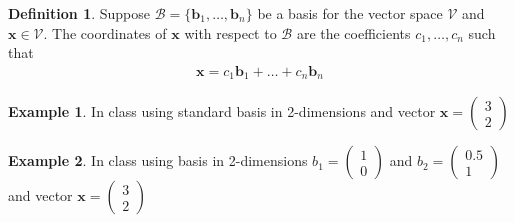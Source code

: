 \documentclass[
]{book}
\newenvironment{Shaded}{\begin{snugshade}}{\end{snugshade}}
\newcommand{\DataTypeTok}[1]{\textcolor[rgb]{0.13,0.29,0.53}{#1}}
\newcommand{\DecValTok}[1]{\textcolor[rgb]{0.00,0.00,0.81}{#1}}
\newcommand{\FloatTok}[1]{\textcolor[rgb]{0.00,0.00,0.81}{#1}}
\newcommand{\KeywordTok}[1]{\textcolor[rgb]{0.13,0.29,0.53}{\textbf{#1}}}
\newcommand{\NormalTok}[1]{#1}
\newcommand{\OperatorTok}[1]{\textcolor[rgb]{0.81,0.36,0.00}{\textbf{#1}}}
\newcommand{\StringTok}[1]{\textcolor[rgb]{0.31,0.60,0.02}{#1}}
\theoremstyle{definition}
\newtheorem{definition}{Definition}[chapter]
\theoremstyle{definition}
\newtheorem{example}{Example}[chapter]
\theoremstyle{definition}
\theoremstyle{definition}
\theoremstyle{remark}
\begin{document}
\begin{definition}
Suppose \(\mathcal{B} = \{ \mathbf{b}_1, \ldots, \mathbf{b}_n \}\) be a basis for the vector space \(\mathcal{V}\) and \(\mathbf{x} \in \mathcal{V}\). The coordinates of \(\mathbf{x}\) with respect to \(\mathcal{B}\) are the coefficients \(c_1, \ldots, c_n\) such that
\[
\begin{aligned}
\mathbf{x} = c_1 \mathbf{b}_1 + \ldots + c_n \mathbf{b}_n
\end{aligned}
\]
\end{definition}

\begin{example}
In class using standard basis in 2-dimensions and vector \(\mathbf{x} = \begin{pmatrix} 3 \\ 2 \end{pmatrix}\)
\end{example}

\begin{example}
In class using basis in 2-dimensions \(b_1 = \begin{pmatrix} 1 \\ 0 \end{pmatrix}\) and \(b_2 = \begin{pmatrix} 0.5 \\ 1 \end{pmatrix}\) and vector \(\mathbf{x} = \begin{pmatrix} 3 \\ 2 \end{pmatrix}\)
\end{example}

\begin{Shaded}
\end{Shaded}
\end{document}
